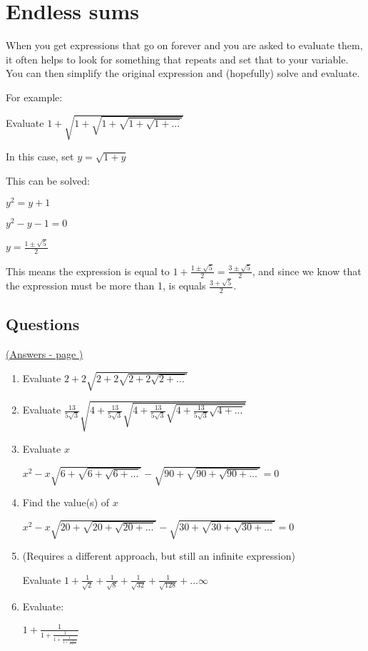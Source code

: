 \documentclass[../main.tex]{subfiles}
\begin{document}
\section{Endless sums}
When you get expressions that go on forever and you are asked to evaluate them, it often helps to look for something that repeats and set that to your variable. You can then simplify the original expression and (hopefully) solve and evaluate.

For example:

Evaluate $1+\sqrt{1+\sqrt{1+\sqrt{1+\sqrt{1+...}}}}$

In this case, set $y=\sqrt{1+y}$

This can be solved:

$y^2=y+1$

$y^2-y-1=0$

$y=\frac{1\pm \sqrt{5}}{2}$

This means the expression is equal to $1+\frac{1\pm \sqrt{5}}{2}=\frac{3\pm \sqrt{5}}{2}$, and since we know that the expression must be more than 1, is equals $\frac{3+\sqrt{5}}{2}$.

\pagebreak
\hypertarget{endlesssumslink}{\subsection*{Questions}}
\hyperlink{endlesssumsanswers}{(Answers - page {\pageref*{Endless sums answers}})}

\label{Endless sums}

\begin{enumerate}[itemsep=2cm]
    \item Evaluate $2+2\sqrt{2+2\sqrt{2+2\sqrt{2+...}}}$
    
    \item Evaluate $\frac{13}{5\sqrt{3}}\sqrt{4+\frac{13}{5\sqrt{3}}\sqrt{4+\frac{13}{5\sqrt{3}}\sqrt{4+\frac{13}{5\sqrt{3}}\sqrt{4+...}}}}$
    
    \item
    Evaluate $x$
    
    $x^2-x\sqrt{6+\sqrt{6+\sqrt{6+...}}}-\sqrt{90+\sqrt{90+\sqrt{90+...}}}=0$

    \item 
    Find the value(s) of $x$
    
    $x^2-x\sqrt{20+\sqrt{20+\sqrt{20+...}}}-\sqrt{30+\sqrt{30+\sqrt{30+...}}}=0$


    \item 
    (Requires a different approach, but still an infinite expression)

    Evaluate $1+\frac{1}{\sqrt{2}}+\frac{1}{\sqrt{8}}+\frac{1}{\sqrt{32}}+\frac{1}{\sqrt{128}}+...\infty$

    \item 
    Evaluate:

    $1+\frac{1}{1+\frac{1}{1+\frac{1}{1+\frac{1}{1+...}}}}$
\end{enumerate}
\end{document}
